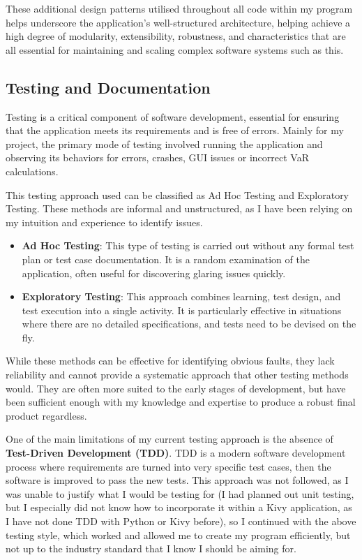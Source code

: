 \documentclass{article}
\begin{document}
These additional design patterns utilised throughout all code within my program helps underscore the application's well-structured architecture, helping achieve a high degree of modularity, extensibility, robustness, and characteristics that are all essential for maintaining and scaling complex software systems such as this.

\subsection{Testing and Documentation}

Testing is a critical component of software development, essential for ensuring that the application meets its requirements and is free of errors. Mainly for my project, the primary mode of testing involved running the application and observing its behaviors for errors, crashes, GUI issues or incorrect VaR calculations.\\\vspace{0.3cm}

This testing approach used can be classified as Ad Hoc Testing and Exploratory Testing. These methods are informal and unstructured, as I have been relying on my intuition and experience to identify issues.

\begin{itemize}
    \item \textbf{Ad Hoc Testing}: This type of testing is carried out without any formal test plan or test case documentation. It is a random examination of the application, often useful for discovering glaring issues quickly.
    \item \textbf{Exploratory Testing}: This approach combines learning, test design, and test execution into a single activity. It is particularly effective in situations where there are no detailed specifications, and tests need to be devised on the fly.
\end{itemize}

While these methods can be effective for identifying obvious faults, they lack reliability and cannot provide a systematic approach that other testing methods would. They are often more suited to the early stages of development, but have been sufficient enough with my knowledge and expertise to produce a robust final product regardless.\\\vspace{0.3cm}

One of the main limitations of my current testing approach is the absence of \textbf{Test-Driven Development (TDD)}. TDD is a modern software development process where requirements are turned into very specific test cases, then the software is improved to pass the new tests. This approach was not followed, as I was unable to justify what I would be testing for (I had planned out unit testing, but I especially did not know how to incorporate it within a Kivy application, as I have not done TDD with Python or Kivy before), so I continued with the above testing style, which worked and allowed me to create my program efficiently, but not up to the industry standard that I know I should be aiming for.\\\vspace{0.3cm}
\end{document}
